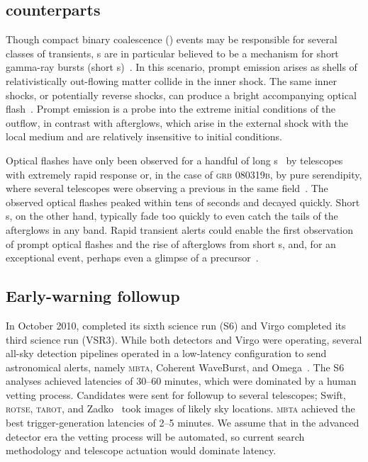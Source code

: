 \subsection{\EM{} counterparts}

Though compact binary coalescence (\CBC{}) events may be responsible for several
classes of \EM{} transients, \CBC{}s are in particular believed to be a
mechanism for short gamma-ray bursts (short \GRB{}s)~\citep{Lee:2005, nakar07}.
In this scenario, prompt \EM{} emission arises as shells of
relativistically out-flowing matter collide in the inner shock.
The same inner shocks, or potentially reverse shocks, can produce a bright
accompanying optical flash~\citep{Sari99}. Prompt emission is a probe into
the extreme initial conditions of the outflow, in contrast with afterglows,
which arise in the external shock with the local medium and are relatively
insensitive to initial conditions.

Optical flashes have only been observed for a handful of long
\GRB{}s~\citep{2011CRPhy..12..255A} by telescopes with extremely rapid response
or, in the case of \textsc{grb 080319b}, by pure serendipity, where several
telescopes were observing a previous \GRB{} in the same
field~\citep{2008Natur.455..183R}. The observed optical flashes peaked
within tens of seconds and decayed quickly.
Short \GRB{}s, on the other hand, typically
fade too quickly to even catch the tails of the afterglows in any band. Rapid
\GW{} transient alerts could enable the first observation of
prompt optical flashes and the rise of afterglows from short \GRB{}s, and, for
an exceptional event, perhaps even a glimpse of a
precursor~\citep{0004-637X-723-2-1711}.

\subsection{Early-warning \EM{} followup}

In October 2010, \LIGO{} completed its sixth science run
(S6) and Virgo completed its third science run (VSR3).  While both
\LIGO{} detectors and Virgo were operating, several all-sky detection
pipelines operated in a low-latency configuration to send astronomical alerts,
namely \textsc{mbta}, Coherent WaveBurst, and
Omega~\citep{HugheyGWPAW2011, S6lowlatency}. The S6 analyses
achieved latencies of 30--60 minutes, which were dominated by a human vetting
process. Candidates were sent for \EM{} followup to several
telescopes; Swift, \textsc{rotse}, \textsc{tarot}, and Zadko~\citep{kanner2008,
HugheyGWPAW2011} took images of likely sky locations.  \textsc{mbta} achieved
the best \GW{} trigger-generation latencies of 2--5 minutes.  We
assume that in the advanced detector era the vetting process will be automated,
so current \GW{} search methodology and telescope actuation would
dominate latency.

